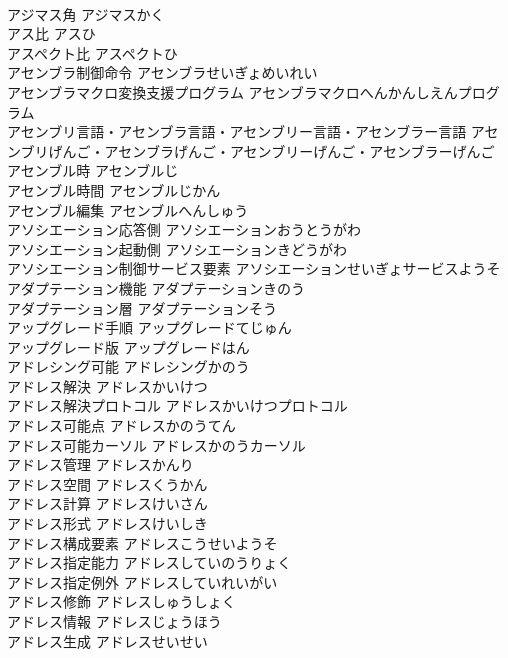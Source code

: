 \documentclass[8pt]{extreport}
\begin{document}
\begin{CJK}{UTF8}{min}
\\	アジマス角	アジマスかく	
\\	アス比	アスひ	
\\	アスペクト比	アスペクトひ	
\\	アセンブラ制御命令	アセンブラせいぎょめいれい	
\\	アセンブラマクロ変換支援プログラム	アセンブラマクロへんかんしえんプログラム	
\\	アセンブリ言語・アセンブラ言語・アセンブリー言語・アセンブラー言語	アセンブリげんご・アセンブラげんご・アセンブリーげんご・アセンブラーげんご	
\\	アセンブル時	アセンブルじ	
\\	アセンブル時間	アセンブルじかん	
\\	アセンブル編集	アセンブルへんしゅう	
\\	アソシエーション応答側	アソシエーションおうとうがわ	
\\	アソシエーション起動側	アソシエーションきどうがわ	
\\	アソシエーション制御サービス要素	アソシエーションせいぎょサービスようそ	
\\	アダプテーション機能	アダプテーションきのう	
\\	アダプテーション層	アダプテーションそう	
\\	アップグレード手順	アップグレードてじゅん	
\\	アップグレード版	アップグレードはん	
\\	アドレシング可能	アドレシングかのう	
\\	アドレス解決	アドレスかいけつ	
\\	アドレス解決プロトコル	アドレスかいけつプロトコル	
\\	アドレス可能点	アドレスかのうてん	
\\	アドレス可能カーソル	アドレスかのうカーソル	
\\	アドレス管理	アドレスかんり	
\\	アドレス空間	アドレスくうかん	
\\	アドレス計算	アドレスけいさん	
\\	アドレス形式	アドレスけいしき	
\\	アドレス構成要素	アドレスこうせいようそ	
\\	アドレス指定能力	アドレスしていのうりょく	
\\	アドレス指定例外	アドレスしていれいがい	
\\	アドレス修飾	アドレスしゅうしょく	
\\	アドレス情報	アドレスじょうほう	
\\	アドレス生成	アドレスせいせい	

\end{CJK}
\end{document}
